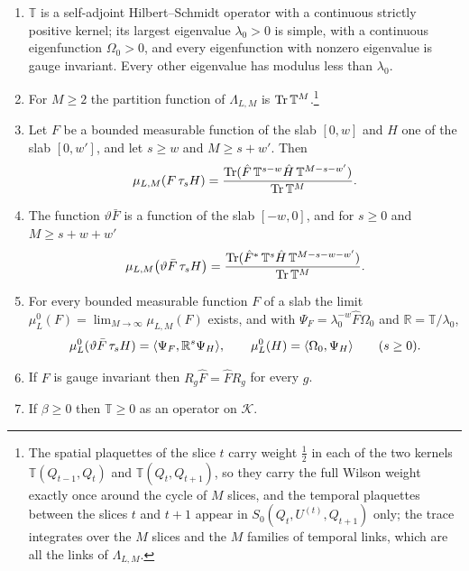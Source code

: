 \begin{lemma}\label{lem:transfer}
\begin{enumerate}[label=\textup{(\roman*)},leftmargin=*]
\item $\mathbb T$ is a self-adjoint Hilbert--Schmidt operator with a
continuous strictly positive kernel; its largest eigenvalue $\lambda_0>0$ is
simple, with a continuous eigenfunction $\Omega_0>0$, and every eigenfunction
with nonzero eigenvalue is gauge invariant. Every other eigenvalue has
modulus less than $\lambda_0$.
\item For $M\ge2$ the partition function of $\Lambda_{L,M}$ is $\operatorname{Tr}\mathbb T^M$.\footnote{The
spatial plaquettes of the slice $t$ carry weight $\frac12$ in each of the two
kernels $\mathbb T(Q_{t-1},Q_t)$ and $\mathbb T(Q_t,Q_{t+1})$, so they carry the
full Wilson weight exactly once around the cycle of $M$ slices, and the
temporal plaquettes between the slices $t$ and $t+1$ appear in $S_0(Q_t,
U^{(t)},Q_{t+1})$ only; the trace integrates over the $M$ slices and the
$M$ families of temporal links, which are all the links of $\Lambda_{L,M}$.}
\item Let $F$ be a bounded measurable function of the slab $[0,w]$ and $H$ one
of the slab $[0,w']$, and let $s\ge w$ and $M\ge s+w'$. Then
\[
\mu_{L,M}(F\,\tau_sH)=\frac{\operatorname{Tr}(\hat F\,\mathbb T^{s-w}\hat H\,\mathbb T^{M-s-w'})}
{\operatorname{Tr}\mathbb T^M}.
\]
\item The function $\vartheta\bar F$ is a function of the slab $[-w,0]$, and
for $s\ge0$ and $M\ge s+w+w'$
\[
\mu_{L,M}\bigl(\vartheta\bar F\,\tau_sH\bigr)=\frac{\operatorname{Tr}(\hat F^*\,\mathbb T^{s}
\hat H\,\mathbb T^{M-s-w-w'})}{\operatorname{Tr}\mathbb T^M}.
\]
\item For every bounded measurable function $F$ of a slab the limit
$\mu^0_{L}(F)=\lim_{M\to\infty}\mu_{L,M}(F)$ exists, and with $\Psi_F=
\lambda_0^{-w}\hat F\Omega_0$ and $\mathbb R=\mathbb T/\lambda_0$,
\[
\mu^0_L(\vartheta\bar F\,\tau_sH)=\langle \Psi_F,\mathbb R^s\Psi_H\rangle,\qquad
\mu^0_L(H)=\langle \Omega_0,\Psi_H\rangle\qquad(s\ge0).
\]
\item If $F$ is gauge invariant then $R_g\hat F=\hat FR_g$ for every $g$.
\item If $\beta\ge0$ then $\mathbb T\ge0$ as an operator on $\mathcal K$.
\end{enumerate}
\end{lemma}

